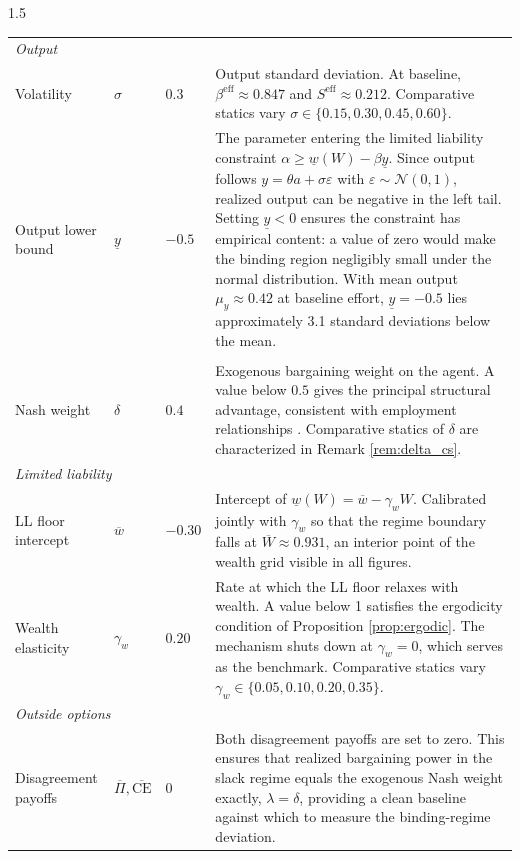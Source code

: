 \documentclass[12pt]{article}
\theoremstyle{definition}
\theoremstyle{plain}
\begin{document}
\begin{spacing}{1.5}
\begin{longtable}{lllp{7cm}}
\multicolumn{4}{l}{\textit{Output}} \\[2pt]
Volatility & $\sigma$ & $0.3$ &
  Output standard deviation. At baseline, $\beta^{\mathrm{eff}} \approx 0.847$ and
  $S^{\mathrm{eff}} \approx 0.212$. Comparative statics vary $\sigma \in \{0.15, 0.30, 0.45, 0.60\}$. \\
Output lower bound & $\underline{y}$ & $-0.5$ &
  The parameter entering the limited liability constraint $\alpha \geq \underline{w}(W) - \beta\underline{y}$.
  Since output follows $y = \theta a + \sigma\varepsilon$ with $\varepsilon \sim \mathcal{N}(0,1)$,
  realized output can be negative in the left tail.
  Setting $\underline{y} < 0$ ensures the constraint has empirical content:
  a value of zero would make the binding region negligibly small under the normal distribution.
  With mean output $\mu_y \approx 0.42$ at baseline effort,
  $\underline{y} = -0.5$ lies approximately 3.1 standard deviations below the mean. \\[6pt]

\pagebreak[4]
\multicolumn{4}{l}{\textit{Bargaining}} \\[2pt]
Nash weight & $\delta$ & $0.4$ &
  Exogenous bargaining weight on the agent. A value below $0.5$ gives the principal
  structural advantage, consistent with employment relationships \parencite{binmore1986}.
  Comparative statics of $\delta$ are characterized in Remark \ref{rem:delta_cs}. \\[6pt]
 
\multicolumn{4}{l}{\textit{Limited liability}} \\[2pt]
LL floor intercept & $\overline{w}$ & $-0.30$ &
  Intercept of $\underline{w}(W) = \overline{w} - \gamma_{w}W$. Calibrated jointly
  with $\gamma_w$ so that the regime boundary falls at $\overline{W} \approx 0.931$,
  an interior point of the wealth grid visible in all figures. \\
Wealth elasticity & $\gamma_{w}$ & $0.20$ &
  Rate at which the LL floor relaxes with wealth. A value below 1 satisfies the
  ergodicity condition of Proposition \ref{prop:ergodic}. The mechanism shuts
  down at $\gamma_{w} = 0$, which serves as the benchmark.
  Comparative statics vary $\gamma_w \in \{0.05, 0.10, 0.20, 0.35\}$. \\[6pt]
 
\multicolumn{4}{l}{\textit{Outside options}} \\[2pt]
Disagreement payoffs & $\overline{\Pi}, \overline{\text{CE}}$ & $0$ &
  Both disagreement payoffs are set to zero. This ensures that realized
  bargaining power in the slack regime equals the exogenous Nash weight exactly,
  $\lambda = \delta$, providing a clean baseline against which to measure
  the binding-regime deviation. \\[6pt]


\end{longtable}
\end{spacing}
\end{document}
